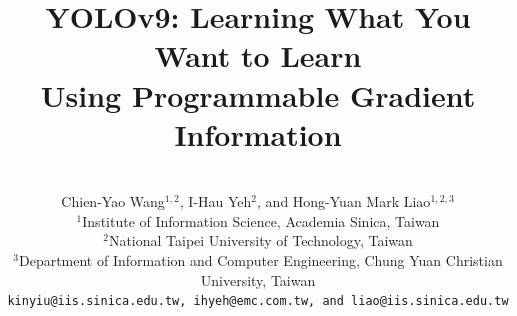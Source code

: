 \documentclass[10pt,twocolumn,letterpaper]{article}
\begin{document}
		
	\title{YOLOv9: Learning What You Want to Learn \\ Using Programmable Gradient Information}
	
	
	\author{
		\vspace{-24pt} \\
		Chien-Yao Wang$^{1, 2}$, I-Hau Yeh$^{2}$, and Hong-Yuan Mark Liao$^{1, 2, 3}$ \\
		$^{1}$Institute of Information Science, Academia Sinica, Taiwan \\
		$^{2}$National Taipei University of Technology, Taiwan \\
		$^{3}$Department of Information and Computer Engineering, Chung Yuan Christian University, Taiwan \\
		{\tt\small kinyiu@iis.sinica.edu.tw, ihyeh@emc.com.tw, and liao@iis.sinica.edu.tw}
		\vspace{-20pt}
	}
	
	\maketitle
	
\end{document}
